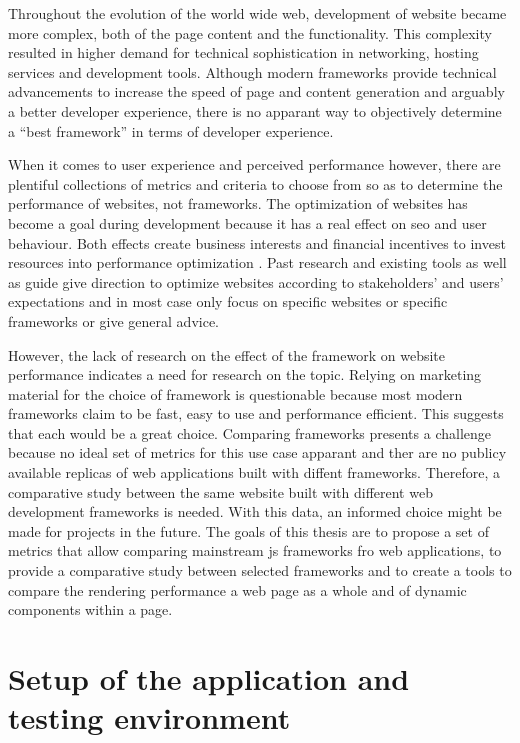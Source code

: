 \documentclass[a4paper, 12pt]{article}
\begin{document}
Throughout the evolution of the world wide web, development of website became more complex, both of the page content and the functionality.
This complexity resulted in higher demand for technical sophistication in networking, hosting services and development tools.
Although modern frameworks provide technical advancements to increase the speed of page and content generation and arguably a better developer experience, there is no apparant way to objectively determine a \enquote{best framework} in terms of developer experience.

When it comes to user experience and perceived performance however, there are plentiful collections of metrics and criteria to choose from so as to determine the performance of websites, not frameworks.
The optimization of websites has become a goal during development because it has a real effect on \acrlong{seo} and user behaviour.
Both effects create business interests and financial incentives to invest resources into performance optimization \citep{webprophet,effectsofwebpagecontents}.
Past research and existing tools as well as guide give direction to optimize websites according to stakeholders' and users' expectations and in most case only focus on specific websites or specific frameworks or give general advice.

However, the lack of research on the effect of the framework on website performance indicates a need for research on the topic.
Relying on marketing material for the choice of framework is questionable because most modern frameworks claim to be fast, easy to use and performance efficient.
This suggests that each would be a great choice.
Comparing frameworks presents a challenge because no ideal set of metrics for this use case apparant and ther are no publicy available replicas of web applications built with diffent frameworks.
Therefore, a comparative study between the same website built with different web development frameworks is needed.
With this data, an informed choice might be made for projects in the future.
The goals of this thesis are to propose a set of metrics that allow comparing mainstream \acrfull{js} frameworks fro web applications, to provide a comparative study between selected frameworks and to create a tools to compare the rendering performance a web page as a whole and of dynamic components within a page.

\section{Setup of the application and testing environment}
\end{document}

